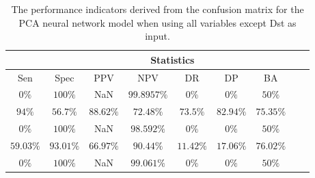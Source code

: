 \begin{table}[!ht]
	\centering
	\begin{tabular}{|c|c|c|c|c|c|c|c|c|}
		\hline
		 & \multicolumn{7}{c|}{Statistics} \\ \hline
		Sen & Spec & PPV & NPV & DR & DP & BA \\ \hline
		$0\%$ & $100\%$ & NaN & $99.8957\%$ & $0\%$ & $0\%$ & $50\%$ \\ \hline
		$94\%$ & $56.7\%$ & $88.62\%$ & $72.48\%$ & $73.5\%$ & $82.94\%$ & $75.35\%$ \\ \hline
		$0\%$ & $100\%$ & NaN & $98.592\%$ & $0\%$ & $0\%$ & $50\%$ \\ \hline
		$59.03\%$ & $93.01\%$ & $66.97\%$ & $90.44\%$ & $11.42\%$ & $17.06\%$ & $76.02\%$ \\ \hline
		$0\%$ & $100\%$ & NaN & $99.061\%$ & $0\%$ & $0\%$ & $50\%$ \\ \hline
	\end{tabular}
	\caption{The performance indicators derived from the confusion matrix for the PCA neural network model when using all variables except Dst as input.}
	\label{tab:cs:noDst:pcaNNet}
\end{table}
